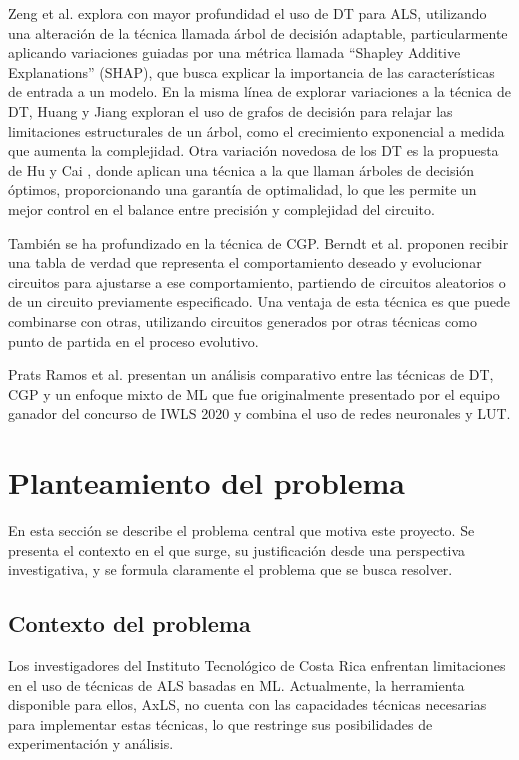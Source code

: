 Zeng et al. \cite{zeng_sampling-based_2021} explora con mayor profundidad el
uso de DT para ALS, utilizando una alteración de la técnica llamada árbol de
decisión adaptable, particularmente aplicando variaciones guiadas por una
métrica llamada ``Shapley Additive Explanations'' (SHAP), que busca explicar la
importancia de las características de entrada a un modelo. En la misma línea de
explorar variaciones a la técnica de DT, Huang y Jiang
\cite{huang_circuit_2023} exploran el uso de grafos de decisión para relajar
las limitaciones estructurales de un árbol, como el crecimiento exponencial a
medida que aumenta la complejidad. Otra variación novedosa de los DT es la
propuesta de Hu y Cai \cite{hu_optdtals_2024}, donde aplican una técnica a la
que llaman árboles de decisión óptimos, proporcionando una garantía de
optimalidad, lo que les permite un mejor control en el balance entre precisión
y complejidad del circuito.

También se ha profundizado en la técnica de CGP. Berndt et al.
\cite{berndt_cgp-based_2022} proponen recibir una tabla de verdad que
representa el comportamiento deseado y evolucionar circuitos para ajustarse a
ese comportamiento, partiendo de circuitos aleatorios o de un circuito
previamente especificado. Una ventaja de esta técnica es que puede combinarse
con otras, utilizando circuitos generados por otras técnicas como punto de
partida en el proceso evolutivo.

Prats Ramos et al. \cite{prats_ramos_impact_2024} presentan un análisis
comparativo entre las técnicas de DT, CGP y un enfoque mixto de ML que fue
originalmente presentado por el equipo ganador del concurso de IWLS 2020
\cite{rai_logic_2021} y combina el uso de redes neuronales y LUT.

\section{Planteamiento del problema}

En esta sección se describe el problema central que motiva este proyecto. Se
presenta el contexto en el que surge, su justificación desde una perspectiva
investigativa, y se formula claramente el problema que se busca resolver.

\subsection{Contexto del problema}

Los investigadores del Instituto Tecnológico de Costa Rica enfrentan
limitaciones en el uso de técnicas de ALS basadas en ML. Actualmente, la
herramienta disponible para ellos, AxLS, no cuenta con las capacidades técnicas
necesarias para implementar estas técnicas, lo que restringe sus posibilidades
de experimentación y análisis.

